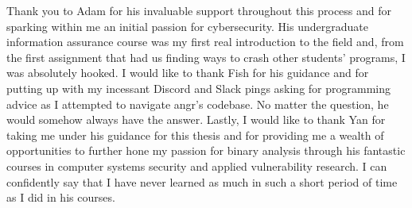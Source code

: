 Thank you to Adam for his invaluable support throughout this process and for sparking within me an initial passion for cybersecurity. His undergraduate information assurance course was my first real introduction to the field and, from the first assignment that had us finding ways to crash other students’ programs, I was absolutely hooked. 
\linebreak
\linebreak
I would like to thank Fish for his guidance and for putting up with my incessant Discord and Slack pings asking for programming advice as I attempted to navigate angr's codebase. No matter the question, he would somehow always have the answer. 
\linebreak
\linebreak
Lastly, I would like to thank Yan for taking me under his guidance for this thesis and for providing me a wealth of opportunities to further hone my passion for binary analysis through his fantastic courses in computer systems security and applied vulnerability research. I can confidently say that I have never learned as much in such a short period of time as I did in his courses.
